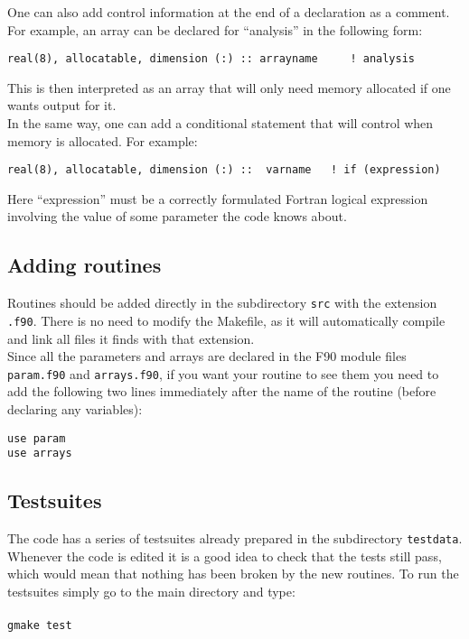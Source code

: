 \documentclass[12pt]{article}
\begin{document}
One can also add control information at the end of a declaration as a
comment.  For example, an array can be declared for ``analysis'' in
the following form:

\begin{verbatim}
real(8), allocatable, dimension (:) :: arrayname     ! analysis
\end{verbatim}

This is then interpreted as an array that will only need memory
allocated if one wants output for it. \\

In the same way, one can add a conditional statement that will control
when memory is allocated.  For example:

\begin{verbatim}
real(8), allocatable, dimension (:) ::  varname   ! if (expression)
\end{verbatim}

Here ``expression'' must be a correctly formulated Fortran logical
expression involving the value of some parameter the code knows about.


\subsection{Adding routines}

Routines should be added directly in the subdirectory \texttt{src}
with the extension \texttt{.f90}.  There is no need to modify the
Makefile, as it will automatically compile and link all files it finds
with that extension. \\

Since all the parameters and arrays are declared in the F90 module
files \texttt{param.f90} and \texttt{arrays.f90}, if you want your
routine to see them you need to add the following two lines
immediately after the name of the routine (before declaring any
variables):

\begin{verbatim}
use param
use arrays
\end{verbatim}


\subsection{Testsuites}

The code has a series of testsuites already prepared in the
subdirectory \texttt{testdata}.  Whenever the code is edited it is a
good idea to check that the tests still pass, which would mean that
nothing has been broken by the new routines. To run the testsuites
simply go to the main directory and type: \\ \\ \texttt{gmake test} \\
\end{document}
